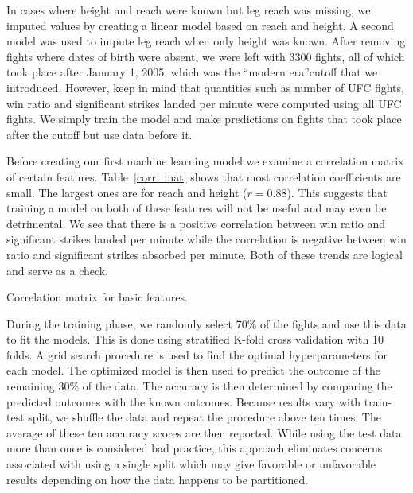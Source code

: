 In cases where height and reach were known but leg reach
was missing, we imputed values by creating a linear model
based on reach and height. A second model was
used to impute leg reach when only height was known. After removing fights where
dates of birth were absent, we were left with 3300 fights,
all of which took place after January 1, 2005, which was
the ``modern era''cutoff that we introduced. However,
keep in mind that quantities such as number of UFC fights,
win ratio and significant strikes landed per minute were computed
using all UFC fights. We simply train the model and make
predictions on fights that took place after the cutoff but
use data before it.

Before creating our first machine learning model we examine a correlation
matrix of certain features. Table~\ref{corr_mat} shows that
most correlation coefficients are small. The largest ones
are for reach and height ($r=0.88$). This suggests that training a model
on both of these features will not be useful and may even be
detrimental. We see that there is a positive
correlation between win ratio and significant strikes landed
per minute while the correlation is negative between win ratio
and significant strikes absorbed per minute. Both of these trends
are logical and serve as a check.

\begin{center}
\begin{table}[h]

\caption{Correlation matrix for basic features.}
\label{corr_mat}
\end{table}
\end{center}

During the training phase, we randomly select 70\% of the fights
and use this data to fit the models. This is done using
stratified K-fold cross validation with 10 folds. A grid search
procedure is used to find the optimal hyperparameters for each
model. The optimized model is then used to predict the outcome
of the remaining 30\% of the data. The accuracy is then determined
by comparing the predicted outcomes with the known outcomes.
Because results vary with train-test split, we shuffle the
data and repeat the procedure above ten times. The average
of these ten accuracy scores are then reported.
While using the
test data more than once is considered bad practice, this approach eliminates
concerns associated with using a single split which may give
favorable or unfavorable results depending on how the data
happens to be partitioned.

